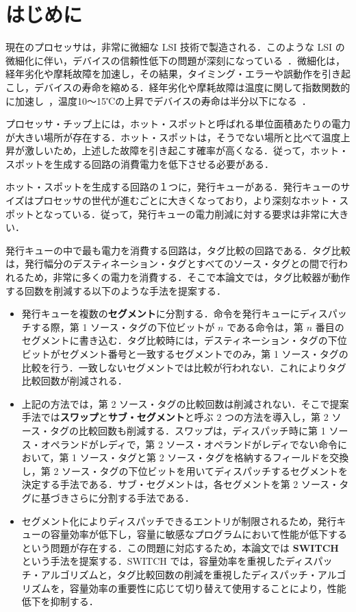 
\chapter{はじめに}
\label{sec:introduction}
現在のプロセッサは，非常に微細な LSI 技術で製造される．このような LSI の微細化に伴い，デバイスの信頼性低下の問題が深刻になっている~\cite{Weste2010}．微細化は，経年劣化や摩耗故障を加速し，その結果，タイミング・エラーや誤動作を引き起こし，デバイスの寿命を縮める．経年劣化や摩耗故障は温度に関して指数関数的に加速し~\cite{Monsieur2001,Khan2010,Black1969}，温度10〜15℃の上昇でデバイスの寿命は半分以下になる~\cite{Viswanath2000}．

プロセッサ・チップ上には，ホット・スポットと呼ばれる単位面積あたりの電力が大きい場所が存在する．ホット・スポットは，そうでない場所と比べて温度上昇が激しいため，上述した故障を引き起こす確率が高くなる．従って，ホット・スポットを生成する回路の消費電力を低下させる必要がある．

ホット・スポットを生成する回路の１つに，発行キューがある．発行キューのサイズはプロセッサの世代が進むごとに大きくなっており，より深刻なホット・スポットとなっている．従って，発行キューの電力削減に対する要求は非常に大きい．
  
発行キューの中で最も電力を消費する回路は，タグ比較の回路である．タグ比較は，発行幅分のデスティネーション・タグとすべてのソース・タグとの間で行われるため，非常に多くの電力を消費する．そこで本論文では，タグ比較器が動作する回数を削減する以下のような手法を提案する．
\begin{itemize}
  \item 発行キューを複数の\textbf{セグメント}に分割する．命令を発行キューにディスパッチする際，第 1 ソース・タグの下位ビットが $n$ である命令は，第 $n$ 番目のセグメントに書き込む．タグ比較時には，デスティネーション・タグの下位ビットがセグメント番号と一致するセグメントでのみ，第 1 ソース・タグの比較を行う．一致しないセグメントでは比較が行われない．これによりタグ比較回数が削減される．
  \item 上記の方法では，第 2 ソース・タグの比較回数は削減されない．そこで提案手法では\textbf{スワップ}と\textbf{サブ・セグメント}と呼ぶ 2 つの方法を導入し，第 2 ソース・タグの比較回数も削減する．スワップは，ディスパッチ時に第 1 ソース・オペランドがレディで，第 2 ソース・オペランドがレディでない命令において，第 1 ソース・タグと第 2  ソース・タグを格納するフィールドを交換し，第 2 ソース・タグの下位ビットを用いてディスパッチするセグメントを決定する手法である．サブ・セグメントは，各セグメントを第 2 ソース・タグに基づきさらに分割する手法である．
  \item セグメント化によりディスパッチできるエントリが制限されるため，発行キューの容量効率が低下し，容量に敏感なプログラムにおいて性能が低下するという問題が存在する．この問題に対応するため，本論文では \textbf{SWITCH} という手法を提案する．SWITCH では，容量効率を重視したディスパッチ・アルゴリズムと，タグ比較回数の削減を重視したディスパッチ・アルゴリズムを，容量効率の重要性に応じて切り替えて使用することにより，性能低下を抑制する．
\end{itemize}

